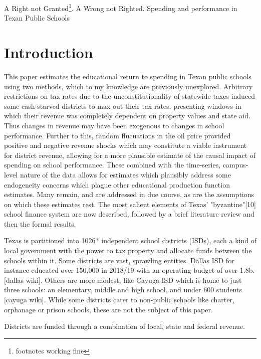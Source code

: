 \documentclass[11pt]{article}
\begin{document}
\setlength{\baselineskip}{0.3in} 

A Right not Granted\footnote{footnotes working fine}. A Wrong not Righted.
Spending and performance in Texan Public Schools

\section{Introduction}
\label{s:intro}

This paper estimates the educational return to spending in Texan public schools using two methods, which to my knowledge are previously unexplored. Arbitrary restrictions on tax rates due to the unconstitutionality of statewide taxes induced some cash-starved districts to max out their tax rates, presenting windows in which their revenue was completely dependent on property values and state aid. Thus changes in revenue may have been exogenous to changes in school performance. Further to this, random flucuations in the oil price provided positive and negative revenue shocks which may constitute a viable instrument for district revenue, allowing for a more plausible estimate of the causal impact of spending on school performance. These combined with the time-series, campus-level nature of the data allows for estimates which plausibly address some endogeneity concerns which plague other educational production function estimates. Many remain, and are addressed in due course, as are the assumptions on which these estimates rest. The most salient elements of Texas' "byzantine"[10] school finance system are now described, followed by a brief literature review and then the formal results. 

Texas is partitioned into 1026* independent school districts (ISDs), each a kind of local government with the power to tax property and allocate funds between the schools within it. Some districts are vast, sprawling entities. Dallas ISD for instance educated over 150,000 in 2018/19 with an operating budget of over 1.8b. [dallas wiki]. Others are more modest, like Cayuga ISD which is home to just three schools: an elementary, middle and high school, and under 600 students [cayuga wiki]. While some districts cater to non-public schools like charter, orphanage or prison schools, these are not the subject of this paper.

Districts are funded through a combination of local, state and federal revenue. 
\end{document}
